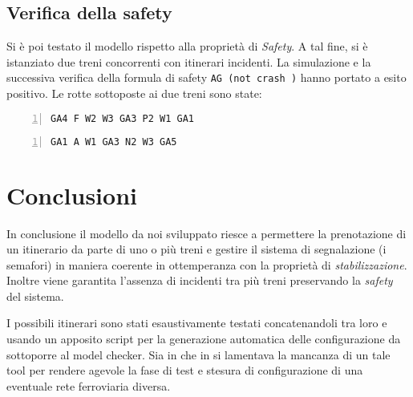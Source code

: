 \documentclass[10pt,a4paper,oneside]{report}
\begin{document}
\section{Verifica della safety}
Si è poi testato il modello rispetto alla proprietà di \emph{Safety}. A tal fine, si è istanziato due treni concorrenti con itinerari incidenti. La simulazione e la successiva verifica della formula di safety \verb!AG (not crash )! hanno portato a esito positivo. Le rotte sottoposte ai due treni sono state:

\begin{lstlisting}[numbers=left,
numberstyle=\tiny,caption={Simulazione di itinerario del primo treno},
label=lst:itinerario2]
GA4 F W2 W3 GA3 P2 W1 GA1
\end{lstlisting}
\begin{lstlisting}[numbers=left,
numberstyle=\tiny,caption={Simulazione di itinerario del secondo treno},
label=lst:itinerario3]
GA1 A W1 GA3 N2 W3 GA5
\end{lstlisting}


\chapter{Conclusioni}
\label{cap:conclusions}
In conclusione il modello da noi sviluppato riesce a permettere la prenotazione di un itinerario da parte di uno o più treni e gestire il sistema di segnalazione (i semafori) in maniera coerente in ottemperanza con la proprietà di \emph{stabilizzazione}. Inoltre viene garantita l'assenza di incidenti tra più treni preservando la \emph{safety} del sistema. 

I possibili itinerari sono stati esaustivamente testati concatenandoli tra loro e usando un apposito script per la generazione automatica delle configurazione da sottoporre al model checker. Sia in \cite{Paolieri} che in \cite{RossettoRocciolo} si lamentava la mancanza di un tale tool per rendere agevole la fase di test e stesura di configurazione di una eventuale rete ferroviaria diversa.

\appendix







\end{document}
